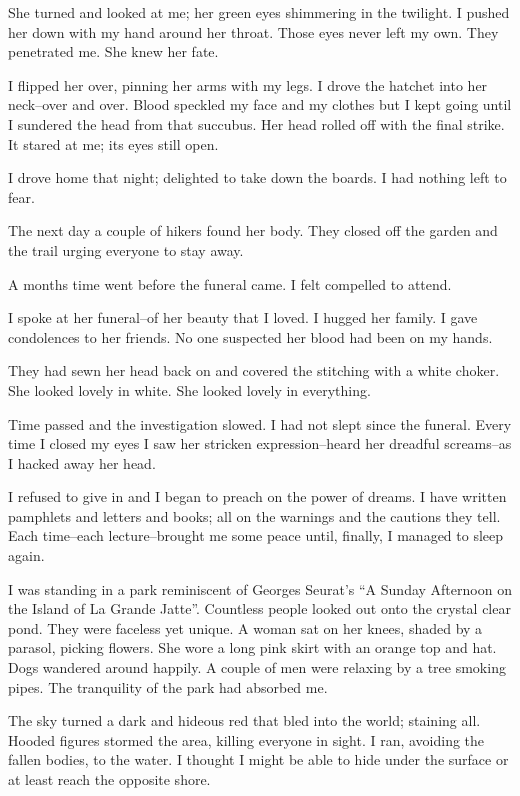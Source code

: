 \documentclass{article}
\begin{document}
She turned and looked at me; her green eyes shimmering in the twilight.
I pushed her down with my hand around her throat.
Those eyes never left my own. They penetrated me.
She knew her fate.


I flipped her over, pinning her arms with my legs.
I drove the hatchet into her neck--over and over.
Blood speckled my face and my clothes but I kept going
until I sundered the head from that succubus.
Her head rolled off with the final strike.
It stared at me; its eyes still open.


I drove home that night;
delighted to take down the boards.
I had nothing left to fear.
\VV


\noindent
The next day a couple of hikers found her body.
They closed off the garden and the trail
urging everyone to stay away.


A months time went before the funeral came.
I felt compelled to attend.


I spoke at her funeral--of her beauty that I loved.
I hugged her family.
I gave condolences to her friends.
No one suspected her blood had been on my hands.


They had sewn her head back on and covered the
stitching with a white choker.
She looked lovely in white.
She looked lovely in everything.
\VV


\noindent
Time passed and the investigation slowed.
I had not slept since the funeral.
Every time I closed my eyes I saw her stricken expression--heard
her dreadful screams--as I hacked away her head.


I refused to give in and I began to preach on the power of dreams.
I have written pamphlets and letters and books;
all on the warnings and the cautions they tell.
Each time--each lecture--brought me some peace
until, finally, I managed to sleep again.
\vvvv


\noindent
I was standing in a park reminiscent of
Georges Seurat's ``A Sunday Afternoon on the Island of La Grande Jatte''.
Countless people looked out onto the crystal clear pond.
They were faceless yet unique.
A woman sat on her knees, shaded by a parasol, picking flowers.
She wore a long pink skirt with an orange top and hat.
Dogs wandered around happily.
A couple of men were relaxing by a tree smoking pipes.
The tranquility of the park had absorbed me.


The sky turned a dark and hideous red that bled into the world;
staining all.  Hooded figures stormed the area, killing everyone in sight.
I ran, avoiding the fallen bodies, to the water.
I thought I might be able to hide under the surface or at least
reach the opposite shore.
\end{document}
